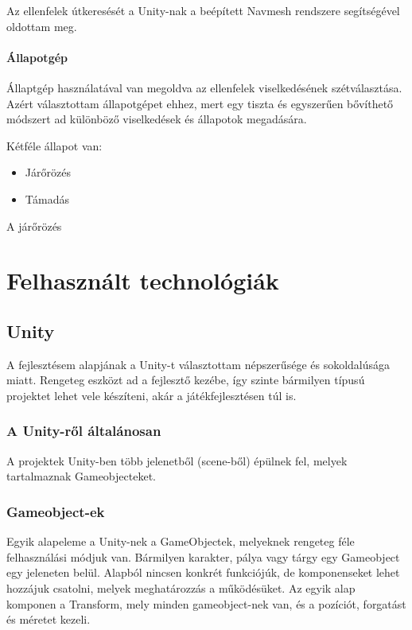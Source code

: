 \documentclass[
]{thesis-ekf}
\theoremstyle{definition}
\theoremstyle{remark}
\begin{document}
Az ellenfelek útkeresését a Unity-nak a beépített Navmesh rendszere segítségével oldottam meg.

\subsubsection{Állapotgép}

Állaptgép használatával van megoldva az ellenfelek viselkedésének szétválasztása. Azért választottam állapotgépet ehhez, mert egy tiszta és egyszerűen bővíthető módszert ad különböző viselkedések és állapotok megadására.

Kétféle állapot van:
\begin{itemize}
 \item Járőrözés
 \item Támadás
\end{itemize}

A járőrözés

\chapter{Felhasznált technológiák}

\section{Unity}

A fejlesztésem alapjának a Unity-t választottam népszerűsége és sokoldalúsága miatt. Rengeteg eszközt ad a fejlesztő kezébe, így szinte bármilyen típusú projektet lehet vele készíteni, akár a játékfejlesztésen túl is.

\subsection{A Unity-ről általánosan}

A projektek Unity-ben több jelenetből (scene-ből) épülnek fel, melyek tartalmaznak Gameobjecteket. 

\subsection{Gameobject-ek}

Egyik alapeleme a Unity-nek a GameObjectek, melyeknek rengeteg féle felhasználási módjuk van. Bármilyen karakter, pálya vagy tárgy egy Gameobject egy jeleneten belül. 
Alapból nincsen konkrét funkciójúk, de komponenseket lehet hozzájuk csatolni, melyek meghatározzás a működésüket. Az egyik alap komponen a Transform, mely minden gameobject-nek van, és a pozíciót, forgatást és méretet kezeli. 
\end{document}
